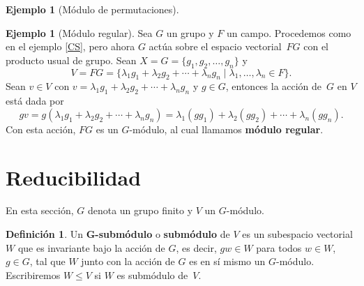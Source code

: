 \documentclass[12pt]{book}
\theoremstyle{definition}
\newtheorem{definition}[theorem]{Definición}
\newtheorem{example}[theorem]{Ejemplo}
\newcounter{in}
\newcounter{ini}
\begin{document}
\begin{example}[Módulo de permutaciones]
\end{example}

\begin{example}[Módulo regular]
  Sea $G$ un grupo y $F$ un campo. Procedemos como en el ejemplo \ref{CS}, pero ahora $G$
  actúa sobre el espacio vectorial~$FG$ con el producto usual de
  grupo. Sean $X=G=\{g_{1},g_{2},\ldots,g_{n}\}$ y 
  \begin{equation*}
    V=FG=\{\lambda_{1}g_{1}+\lambda_{2}g_{2}+\cdots
    +\lambda_{n}g_{n}\mid\lambda_{1},\ldots,\lambda_{n}\in F\}.
  \end{equation*}
 Sean $v\in V$ con $v=\lambda_{1}g_{1}+\lambda_{2}g_{2}+\cdots
 +\lambda_{n}g_{n}$ y $g\in G$, entonces la acción de~$G$ en $V$ está dada por
  \begin{equation*}
    gv=g(\lambda_{1}g_{1}+\lambda_{2}g_{2}+\cdots +\lambda_{n}g_{n})=\lambda_{1}(gg_{1})+\lambda_{2}(gg_{2})+\cdots +\lambda_{n}(gg_{n}).
  \end{equation*}
Con esta acción, $FG$ es un $G$-módulo, al cual llamamos \textbf{módulo regular}.  
\end{example}

\section{Reducibilidad}
\label{reducibilidad}

En esta sección, $G$ denota un grupo finito y $V$ un $G$-módulo.

\begin{definition}
  Un $\boldsymbol{G}$\textbf{-submódulo} o
  \textbf{submódulo} de $V$ es un subespacio vectorial
  $W$ que es invariante bajo la acción de $G$, es decir, $ gw\in W$
  para todos $w\in W$, $g\in G$, tal que $W$ junto con la acción de
  $G$ es en sí mismo un $G$-módulo. Escribiremos $W\leq V$ si $W$ es
  submódulo de~$V$. 
\end{definition}
\end{document}

